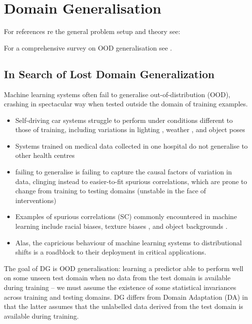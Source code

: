 \section{Domain Generalisation}

For references re the general problem setup and theory see:
\citet{gulrajani2020search, krueger2021out, arjovskyinvariant, ahuja2020invariant,
weber2022certifying, rosenfeld2020risks}

For a comprehensive survey on OOD generalisation see  \citet{shen2021towards}.

\subsection{In Search of Lost Domain Generalization \citep{gulrajani2020search}}
Machine learning systems often fail to generalise out-of-distribution (OOD), crashing in 
spectacular way when tested outside the domain of training examples.

\itemi\begin{itemize}
  \item Self-driving car systems struggle to perform under conditions different to those of 
    training, including variations in lighting \citep{dai2018dark}, weather \citep{volk2019towards}, 
    and object poses \citep{alcorn2019strike}
  \item Systems trained on medical data collected in one hospital do not generalise to other health
    centres \citep{castro2020causality, albadawy2018deep}
  \item failing to generalise is failing to capture the causal factors of variation in data, 
    clinging instead to easier-to-fit spurious correlations, which are prone to change from 
    training to testing domains (unstable in the face of interventions)
  \item  Examples of spurious correlations (SC) commonly encountered in machine learning include 
    racial biases, texture biases \citep{geirhos2018imagenet}, and object backgrounds
    \citep{beery2018recognition} .
  \item Alas, the capricious behaviour of machine learning systems to distributional shifts is a 
    roadblock to their deployment in critical applications.
\end{itemize}

The goal of DG is OOD generalisation: learning a predictor able to perform well on some unseen test
domain when no data from the test domain is available during training -- we must assume the 
existence of some statistical invariances across training and testing domains.
DG differs from Domain Adaptation (DA) in that the latter assumes that the unlabelled data derived 
from the test domain is available during training.

